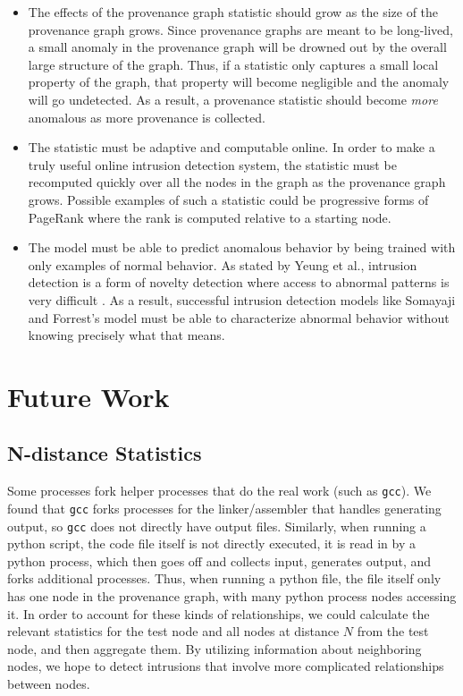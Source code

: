 \documentclass[10pt,twocolumn]{article}
\begin{document}
\begin{itemize}
\item The effects of the provenance graph statistic should grow as the size of the provenance graph grows. Since provenance graphs are meant to be long-lived, a small anomaly in the provenance graph will be drowned out by the overall large structure of the graph. Thus, if a statistic only captures a small local property of the graph, that property will become negligible and the anomaly will go undetected. As a result, a provenance statistic should become {\em more} anomalous as more provenance is collected.

\item The statistic must be adaptive and computable online. In order to make a truly useful online intrusion detection system, the statistic must be recomputed quickly over all the nodes in the graph as the provenance graph grows. Possible examples of such a statistic could be progressive forms of PageRank where the rank is computed relative to a starting node.

\item The model must be able to predict anomalous behavior by being trained with only examples of normal behavior. As stated by Yeung et al., intrusion detection is a form of novelty detection where access to abnormal patterns is very difficult \cite{parzen}. As a result, successful intrusion detection models like Somayaji and Forrest's model must be able to characterize abnormal behavior without knowing precisely what that means.
\end{itemize}


%

\section{Future Work}

\subsection{N-distance Statistics}
Some processes fork helper processes that do the real work (such as \texttt{gcc}). We found that \texttt{gcc} forks processes for the linker/assembler that handles generating output, so \texttt{gcc} does not directly have output files. Similarly, when running a python script, the code file itself is not directly executed, it is read in by a python process, which then goes off and collects input, generates output, and forks additional processes. Thus, when running a python file, the file itself only has one node in the provenance graph, with many python process nodes accessing it. In order to account for these kinds of relationships, we could calculate the relevant statistics for the test node and all nodes at distance $N$ from the test node, and then aggregate them. By utilizing information about neighboring nodes, we hope to detect intrusions that involve more complicated relationships
between nodes.
\end{document}

